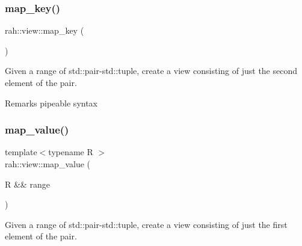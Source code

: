 \subsubsection{\texorpdfstring{map\_key()}{map\_key()}\hspace{0.1cm}{\footnotesize\ttfamily [2/2]}}
{\footnotesize\ttfamily rah\+::view\+::map\+\_\+key (\begin{DoxyParamCaption}{ }\end{DoxyParamCaption})}



Given a range of std\+::pair-\/std\+::tuple, create a view consisting of just the second element of the pair. 

\begin{DoxyRemark}{Remarks}
pipeable syntax
\end{DoxyRemark}

\begin{DoxyCodeInclude}{0}
\end{DoxyCodeInclude}
\mbox{\label{namespacerah_1_1view_abde9f999ff37f8b31f7a25598f2b4a25}} 
\subsubsection{\texorpdfstring{map\_value()}{map\_value()}\hspace{0.1cm}{\footnotesize\ttfamily [1/2]}}
{\footnotesize\ttfamily template$<$typename R $>$ \\
rah\+::view\+::map\+\_\+value (\begin{DoxyParamCaption}\item[{R \&\&}]{range }\end{DoxyParamCaption})}



Given a range of std\+::pair-\/std\+::tuple, create a view consisting of just the first element of the pair. 


